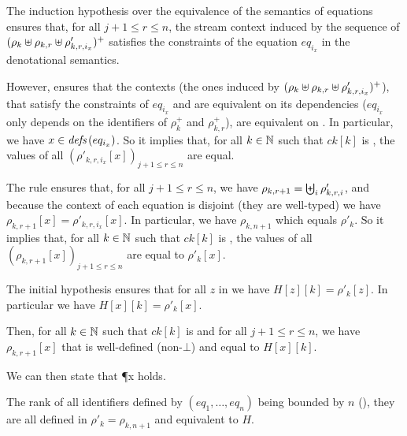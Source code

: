 \begin{skippableproof}
\begin{itemize}
              The induction hypothesis over the equivalence of the semantics of equations ensures
              that, for all $j+1 \le r \le n$, the stream context induced by the sequence of
              $(\rho_k \uplus \rho_{k,r} \uplus \rho'_{k,r,i_x})^+$ satisfies the constraints of
              the equation $eq_{i_x}$ in the denotational semantics.

              However,  ensures that the contexts (the
              ones induced by $(\rho_k \uplus \rho_{k,r} \uplus \rho'_{k,r,i_x})^+$), that satisfy
              the constraints of $eq_{i_x}$ and are equivalent on its dependencies ($eq_{i_x}$ only
              depends on the identifiers of $\rho_k^+$ and $\rho_{k,r}^+$), are equivalent on
              . In particular, we have $x \in {\ensuremath{\textit{defs}\left(eq_{i_x}\right)}}$. So it implies that,
              for all $k \in \mathbb{N}$ such that $ck[k]$ is \true, the values of all
              $(\rho'_{k,r,i_x}[x])_{j+1 \le r \le n}$ are equal.

              The rule  ensures that, for all
              $j+1 \le r \le n$, we have $\rho_{k,r+1} = \biguplus_i \rho'_{k,r,i}$, and because the
              context of each equation is disjoint (they are well-typed) we have $\rho_{k,r+1}[x] =
                  \rho'_{k,r,i_x}[x]$. In particular, we have $\rho_{k,n+1}$ which equals $\rho'_k$.
              So it implies that, for all $k \in \mathbb{N}$ such that $ck[k]$ is \true, the
              values of all $(\rho_{k,r+1}[x])_{j+1 \le r \le n}$ are equal to $\rho'_k[x]$.

              The initial hypothesis ensures that for all $z$ in  we have $H[z][k] =
                  \rho'_k[z]$. In particular we have  $H[x][k] = \rho'_k[x]$.

              Then, for all $k \in \mathbb{N}$ such that $ck[k]$ is \true and for all
              $j+1 \le r \le n$, we have $\rho_{k,r+1}[x]$ that is well-defined (non-$\bot$) and
              equal to $H[x][k]$.

              We can then state that \P{x} holds.
    \end{itemize}

    The rank of all identifiers defined by $(eq_1, \dots, eq_n)$ being bounded by $n$ (), they are all defined in $\rho'_k = \rho_{k,n+1}$
    and equivalent to $H$.


\end{skippableproof}
